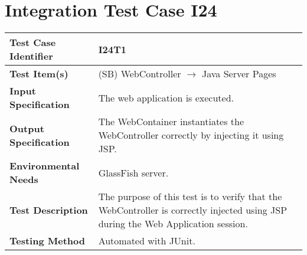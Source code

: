 \section{Integration Test Case I24}

\begin{longtable}{p{} | p{}}
\hline
\textbf{Test Case Identifier} & I24T1\\
\hline
\textbf{Test Item(s)} & (SB) WebController $\rightarrow$ Java Server Pages \\
\hline
\textbf{Input Specification} & The web application is executed. \\
\hline
\textbf{Output Specification} & The WebContainer instantiates the WebController correctly by injecting it using JSP. \\
\hline
\textbf{Environmental Needs} & GlassFish server. \\
\hline
\textbf{Test Description} & The purpose of this test is to verify that the WebController is correctly injected using JSP during the Web Application session. \\
\hline
\textbf{Testing Method} & Automated with JUnit. \\
\hline
\end{longtable}